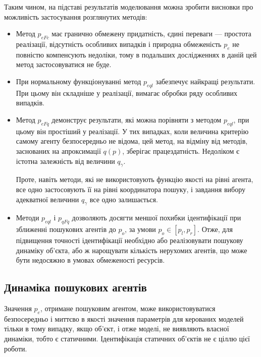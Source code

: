 Таким чином, на підставі результатів моделювання можна зробити висновки про
можливість застосування розглянутих методів:


\begin{itemize}

  \item
    Метод $p_{eFc}$ має гранично  обмежену придатність,
    єдині переваги --- простота реалізації,
    відсутність особливих випадків і природна обмеженість
    $ p_e $ не повністю компенсують недоліки, тому в подальших
    дослідженнях в даній цей метод застосовуватися не буде.

  \item
    При нормальному функціонуванні метод $p_{eql}$ забезпечує найкращі
    результати. При цьому він складніше у реалізації, вимагає обробки ряду
    особливих випадків.

  \item
    Метод $p_{eFq}$ демонструє результати, які можна
    порівняти з методом $p_{eql}$, при цьому він простіший у реалізації. У тих
    випадках, коли величина критерію самому агенту безпосередньо не відома, цей
    метод, на відміну від методів, заснованих на апроксимації $q (p)$, зберігає
    працездатність. Недоліком є істотна залежність від величини $q_\gamma$.

    Проте, навіть методи, які не використовують функцію якості на
    рівні агента, все одно застосовують її на рівні координатора
    пошуку, і завдання вибору адекватної величини
    $ q_\gamma $ все одно залишається.

  \item
    Методи $p_{eql}$ і $p_{qFq}$ дозволяють досягти меншої похибки
    ідентифікації при зближенні пошукових агентів до $p_o$, за умови $p_o \in [p_l, p_r]$.
    Отже, для підвищення точності ідентифікації необхідно або
    реалізовувати пошукову динаміку об'єкта, або ж нарощувати
    кількість нерухомих агентів, що може бути недосяжно в умовах
    обмеженості ресурсів.


\end{itemize}





\subsection{Динаміка пошукових агентів}%

Значення $p_e$, отримане пошуковим агентом, може використовуватися
безпосередньо і миттєво в якості значення параметрів для керованих моделей
тільки в тому випадку, якщо об'єкт, і отже моделі, не виявляють власної
динаміки, тобто є статичними. Ідентифікація статичних об'єктів не є ціллю
цієї роботи.

